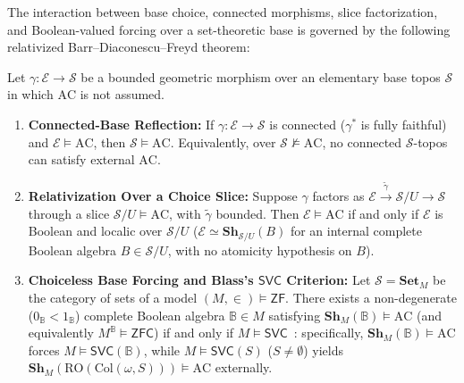 The interaction between base choice, connected morphisms, slice factorization, and Boolean-valued forcing over a set-theoretic base is governed by the following relativized Barr--Diaconescu--Freyd theorem:

\begin{theorem}\label{thm:bdf-deformed}%
%

Let $\gamma: \mathcal{E} \to \mathcal{S}$ be a bounded geometric morphism over an elementary base topos $\mathcal{S}$ in which $\mathrm{AC}$ is not assumed.

\begin{enumerate}

  \item \textbf{Connected-Base Reflection:} If $\gamma : \mathcal{E} \to \mathcal{S}$ is connected ($\gamma^*$ is fully faithful) and $\mathcal{E} \models \mathrm{AC}$, then $\mathcal{S} \models \mathrm{AC}$. Equivalently, over $\mathcal{S} \not\models \mathrm{AC}$, no connected $\mathcal{S}$-topos can satisfy external $\mathrm{AC}$.

  \item \textbf{Relativization Over a Choice Slice:} Suppose $\gamma$ factors as $\mathcal{E} \xrightarrow{\tilde{\gamma}} \mathcal{S}/U \to \mathcal{S}$ through a slice $\mathcal{S}/U \models \mathrm{AC}$, with $\tilde{\gamma}$ bounded. Then $\mathcal{E} \models \mathrm{AC}$ if and only if $\mathcal{E}$ is Boolean and localic over $\mathcal{S}/U$ ($\mathcal{E} \simeq \mathbf{Sh}_{\mathcal{S}/U}(B)$ for an internal complete Boolean algebra $B \in \mathcal{S}/U$, with no atomicity hypothesis on $B$).

  \item \textbf{Choiceless Base Forcing and Blass's $\mathsf{SVC}$ Criterion:} Let $\mathcal{S} = \mathbf{Set}_M$ be the category of sets of a model $(M, \in) \models \mathsf{ZF}$. There exists a non-degenerate ($0_{\mathbb{B}} < 1_{\mathbb{B}}$) complete Boolean algebra $\mathbb{B} \in M$ satisfying $\mathbf{Sh}_M(\mathbb{B}) \models \mathrm{AC}$ (and equivalently $M^{\mathbb{B}} \models \mathsf{ZFC}$) if and only if $M \models \mathsf{SVC}$~\cite{Blass79,Usuba21}: specifically, $\mathbf{Sh}_M(\mathbb{B}) \models \mathrm{AC}$ forces $M \models \mathsf{SVC}(\mathbb{B})$, while $M \models \mathsf{SVC}(S)$ ($S \neq \emptyset$) yields $\mathbf{Sh}_M(\mathrm{RO}(\mathrm{Col}(\omega, S))) \models \mathrm{AC}$ externally.

\end{enumerate}

\end{theorem}

